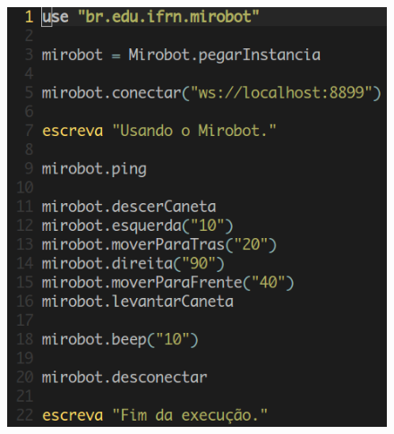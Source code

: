 \begin{figure}[H]
\centering
\includegraphics[scale=0.50]{imagens/teste-potigol.png} 
\label{fig:testepotigol}
\end{figure}
